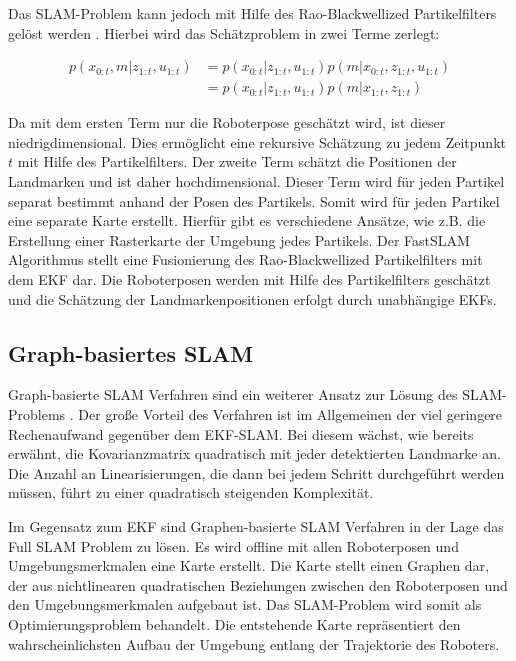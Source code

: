 Das SLAM-Problem kann jedoch mit Hilfe des Rao-Blackwellized Partikelfilters  gelöst werden \cite{Stachniss2016}. Hierbei wird das Schätzproblem in zwei Terme zerlegt: 

\begin{align}
	p(x_{0:t},m \vert z_{1:t},u_{1:t}) &= p(x_{0:t} \vert z_{1:t},u_{1:t})p(m \vert x_{0:t},z_{1:t},u_{1:t}) \\
	&= p(x_{0:t} \vert z_{1:t},u_{1:t})p(m \vert x_{1:t},z_{1:t})
\end{align}

Da mit dem ersten Term nur die Roboterpose geschätzt wird, ist dieser niedrigdimensional. Dies ermöglicht eine rekursive Schätzung zu jedem Zeitpunkt $ t $ mit Hilfe des Partikelfilters. Der zweite Term schätzt die Positionen der Landmarken und ist daher hochdimensional. Dieser Term wird für jeden Partikel separat bestimmt anhand der Posen des Partikels. Somit wird für jeden Partikel eine separate Karte erstellt. Hierfür gibt es verschiedene Ansätze, wie z.B. die Erstellung einer Rasterkarte der Umgebung jedes Partikels. Der FastSLAM Algorithmus stellt eine Fusionierung des Rao-Blackwellized Partikelfilters mit dem EKF dar. Die Roboterposen werden mit Hilfe des Partikelfilters geschätzt und die Schätzung der Landmarkenpositionen erfolgt durch unabhängige EKFs.   

\subsection[Graph-basiertes SLAM (Kopp)]{Graph-basiertes SLAM}

Graph-basierte SLAM Verfahren sind ein weiterer Ansatz zur Lösung des SLAM-Problems \cite{thrun2005}. Der große Vorteil des Verfahren ist im Allgemeinen der viel geringere Rechenaufwand gegenüber dem EKF-SLAM. Bei diesem wächst, wie bereits erwähnt, die Kovarianzmatrix quadratisch mit jeder detektierten Landmarke an. Die Anzahl an Linearisierungen, die dann bei jedem Schritt durchgeführt werden müssen, führt zu einer quadratisch steigenden Komplexität. 

Im Gegensatz zum EKF sind Graphen-basierte SLAM Verfahren in der Lage das Full SLAM Problem zu lösen. Es wird offline mit allen Roboterposen und Umgebungsmerkmalen eine Karte erstellt. Die Karte stellt einen Graphen dar, der aus nichtlinearen quadratischen Beziehungen zwischen den Roboterposen und den Umgebungsmerkmalen aufgebaut ist. Das SLAM-Problem wird somit als Optimierungsproblem behandelt. Die entstehende Karte repräsentiert den wahrscheinlichsten Aufbau der Umgebung entlang der Trajektorie des Roboters. 

